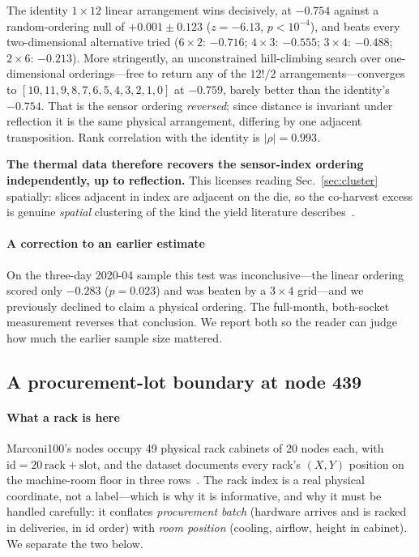 \documentclass[10pt,conference]{IEEEtran}
\begin{document}
The identity $1\times12$ linear arrangement wins decisively, at $-0.754$ against a
random-ordering null of $+0.001\pm0.123$ ($z=-6.13$, $p<10^{-4}$), and beats every two-dimensional
alternative tried ($6\times2$: $-0.716$; $4\times3$: $-0.555$; $3\times4$: $-0.488$; $2\times6$:
$-0.213$). More stringently, an unconstrained hill-climbing search over one-dimensional
orderings---free to return any of the $12!/2$ arrangements---converges to
$[10,11,9,8,7,6,5,4,3,2,1,0]$ at $-0.759$, barely better than the identity's $-0.754$. That is the
sensor ordering \emph{reversed}; since distance is invariant under reflection it is the same
physical arrangement, differing by one adjacent transposition. Rank correlation with the identity
is $|\rho|=0.993$.

\textbf{The thermal data therefore recovers the sensor-index ordering independently, up to
reflection.} This licenses reading Sec.~\ref{sec:cluster} spatially: slices adjacent in index are
adjacent on the die, so the co-harvest excess is genuine \emph{spatial} clustering of the kind the
yield literature describes~\cite{koren1993negbinom,bae2007waferyield}.

\paragraph*{A correction to an earlier estimate} On the three-day 2020-04 sample this test was
inconclusive---the linear ordering scored only $-0.283$ ($p=0.023$) and was beaten by a $3\times4$
grid---and we previously declined to claim a physical ordering. The full-month, both-socket
measurement reverses that conclusion. We report both so the reader can judge how much the earlier
sample size mattered.

\subsection{A procurement-lot boundary at node 439}
\label{sec:lot}
\paragraph*{What a rack is here} Marconi100's nodes occupy 49 physical rack cabinets of 20 nodes
each, with $\mathrm{id}=20\,\mathrm{rack}+\mathrm{slot}$, and the dataset documents every rack's
$(X,Y)$ position on the machine-room floor in three rows~\cite{exadata_repo}. The rack index is a
real physical coordinate, not a label---which is why it is informative, and why it must be handled
carefully: it conflates \emph{procurement batch} (hardware arrives and is racked in deliveries, in
id order) with \emph{room position} (cooling, airflow, height in cabinet). We separate the two
below.
\end{document}
